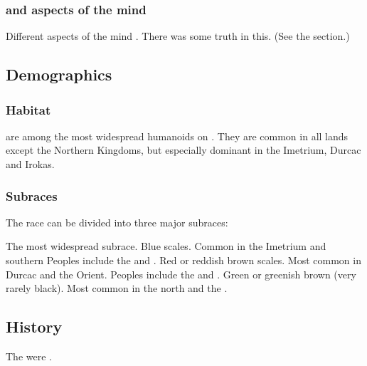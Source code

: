 \subsubsection{\XzaiShanns and aspects of the mind}
Different aspects of the \scathaese mind .
There was some truth in this. 
(See the section.)









\subsection{Demographics}
\subsubsection{Habitat}
\Scathae{} are among the most widespread humanoids on \Miith{}. 
They are common in all lands except the Northern Kingdoms, but especially dominant in the Imetrium, Durcac and Irokas. 





\subsubsection{Subraces}
The \scathaese{} race can be divided into three major subraces: 

\begin{gloss}
  \gitem[\Tassians]{\Tassian}
    The most widespread subrace. 
    Blue scales. 
    Common in the Imetrium and southern \Velcad{}
    Peoples include the  and . 
  \gitem[\Mekriis]{\Mekrii}
    Red or reddish brown scales.
    Most common in Durcac and the Orient. 
    Peoples include the  and . 
  \gitem[\Lois]{\Loi}
    Green or greenish brown (very rarely black).
    Most common in the north and the \Serplands. 
\end{gloss}










\subsection{History}
The \scathae{} were . 

